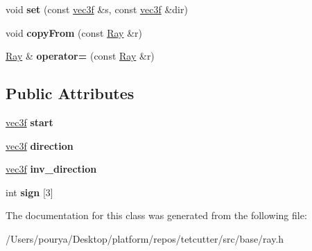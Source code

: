 \begin{DoxyCompactItemize}
\item 
\hypertarget{classps_1_1base_1_1Ray_ad17d64817cc7a38b28eba00c641d9404}{}void {\bfseries set} (const \hyperlink{classps_1_1base_1_1Vec3}{vec3f} \&s, const \hyperlink{classps_1_1base_1_1Vec3}{vec3f} \&dir)\label{classps_1_1base_1_1Ray_ad17d64817cc7a38b28eba00c641d9404}

\item 
\hypertarget{classps_1_1base_1_1Ray_aed6721502eb80865ca5824ec3e2c5bbd}{}void {\bfseries copy\+From} (const \hyperlink{classps_1_1base_1_1Ray}{Ray} \&r)\label{classps_1_1base_1_1Ray_aed6721502eb80865ca5824ec3e2c5bbd}

\item 
\hypertarget{classps_1_1base_1_1Ray_a006e1796377d6bb0241f747bb71fed36}{}\hyperlink{classps_1_1base_1_1Ray}{Ray} \& {\bfseries operator=} (const \hyperlink{classps_1_1base_1_1Ray}{Ray} \&r)\label{classps_1_1base_1_1Ray_a006e1796377d6bb0241f747bb71fed36}

\end{DoxyCompactItemize}
\subsection*{Public Attributes}
\begin{DoxyCompactItemize}
\item 
\hypertarget{classps_1_1base_1_1Ray_aa050c69ba047fcae36e38f9ca83bc09f}{}\hyperlink{classps_1_1base_1_1Vec3}{vec3f} {\bfseries start}\label{classps_1_1base_1_1Ray_aa050c69ba047fcae36e38f9ca83bc09f}

\item 
\hypertarget{classps_1_1base_1_1Ray_a7c536c113ce58ae4f487d3011ad84094}{}\hyperlink{classps_1_1base_1_1Vec3}{vec3f} {\bfseries direction}\label{classps_1_1base_1_1Ray_a7c536c113ce58ae4f487d3011ad84094}

\item 
\hypertarget{classps_1_1base_1_1Ray_a4355800493d935690aee4ca975168998}{}\hyperlink{classps_1_1base_1_1Vec3}{vec3f} {\bfseries inv\+\_\+direction}\label{classps_1_1base_1_1Ray_a4355800493d935690aee4ca975168998}

\item 
\hypertarget{classps_1_1base_1_1Ray_a44474e2567345a49460edba3871fbdb0}{}int {\bfseries sign} \mbox{[}3\mbox{]}\label{classps_1_1base_1_1Ray_a44474e2567345a49460edba3871fbdb0}

\end{DoxyCompactItemize}


The documentation for this class was generated from the following file\+:\begin{DoxyCompactItemize}
\item 
/\+Users/pourya/\+Desktop/platform/repos/tetcutter/src/base/ray.\+h\end{DoxyCompactItemize}
